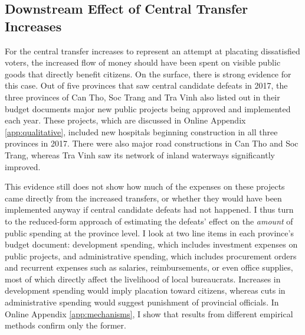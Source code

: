 \documentclass[12pt]{article}
\newcommand{\1}{\mathbbm{1}}
\begin{document}
\subsection*{Downstream Effect of Central Transfer Increases}

For the central transfer increases to represent an attempt at placating dissatisfied voters, the increased flow of money should have been spent on visible public goods that directly benefit citizens. 
On the surface, there is strong evidence for this case. Out of five provinces that saw central candidate defeats in 2017, the three provinces of Can Tho, Soc Trang and Tra Vinh also listed out in their budget documents major new public projects being approved and implemented each year. These projects, which are discussed in Online Appendix \ref{app:qualitative}, included new hospitals beginning construction in all three provinces in 2017. There were also major road constructions in Can Tho and Soc Trang, whereas Tra Vinh saw its network of inland waterways significantly improved. 

This evidence still does not show how much of the expenses on these projects came directly from the increased transfers, or whether they would have been implemented anyway if central candidate defeats had not happened. I thus turn to the reduced-form approach of estimating the defeats' effect on the \textit{amount} of public spending at the province level. I look at two line items in each province's budget document: development spending, which includes investment expenses on public projects, and administrative spending, which includes procurement orders and recurrent expenses such as salaries, reimbursements, or even office supplies, most of which directly affect the livelihood of local bureaucrats. Increases in development spending would imply placation toward citizens, whereas cuts in administrative spending would suggest punishment of provincial officials. In Online Appendix \ref{app:mechanisms}, I show that results from different empirical methods confirm only the former.
\end{document}
